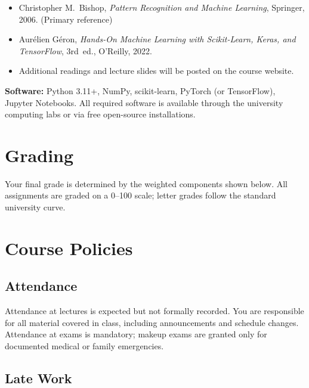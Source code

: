 \documentclass[
    language=english,
    doctype=syllabus,
    institution=none,
]{../../omnilatex}
\begin{document}
\begin{itemize}
    \item Christopher M.~Bishop, \emph{Pattern Recognition and Machine
          Learning}, Springer, 2006. (Primary reference)
    \item Aur\'{e}lien G\'{e}ron, \emph{Hands-On Machine Learning with
          Scikit-Learn, Keras, and TensorFlow}, 3rd~ed., O'Reilly, 2022.
    \item Additional readings and lecture slides will be posted on the course
          website.
\end{itemize}

\noindent\textbf{Software:} Python 3.11+, NumPy, scikit-learn, PyTorch (or
TensorFlow), Jupyter Notebooks.  All required software is available through
the university computing labs or via free open-source installations.

\section{Grading}

Your final grade is determined by the weighted components shown below.
All assignments are graded on a 0--100 scale; letter grades follow the
standard university curve.

\begin{gradingpolicy}
\end{gradingpolicy}

\section{Course Policies}

\subsection{Attendance}

Attendance at lectures is expected but not formally recorded.  You are
responsible for all material covered in class, including announcements
and schedule changes.  Attendance at exams is mandatory; makeup exams are
granted only for documented medical or family emergencies.

\subsection{Late Work}
\end{document}
